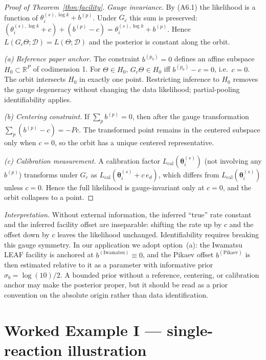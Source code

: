\documentclass[12pt]{article}
\theoremstyle{plain}
\theoremstyle{definition}
\theoremstyle{remark}
\newcommand{\R}{\mathbb{R}}
\begin{document}
\begin{proof}[Proof of Theorem~\ref{thm:facility}]
\emph{Gauge invariance.}  By (A6.1) the likelihood is a function of
$\theta_i^{(s),\log k}+b^{(p)}$.  Under $G_c$ this sum is preserved:
$(\theta_i^{(s),\log k}+c)+(b^{(p)}-c)=\theta_i^{(s),\log k}+b^{(p)}$.
Hence $L(G_c\Theta;\mathcal{D})=L(\Theta;\mathcal{D})$ and the
posterior is constant along the orbit.

\emph{(a) Reference paper anchor.}  The constraint $b^{(p_0)}=0$
defines an affine subspace $H_0\subset\R^P$ of codimension 1.  For
$\Theta\in H_0$, $G_c\Theta\in H_0$ iff $b^{(p_0)}-c=0$, i.e.\ $c=0$.
The orbit intersects $H_0$ in exactly one point.  Restricting
inference to $H_0$ removes the gauge degeneracy without changing the
data likelihood; partial-pooling identifiability
\citep[Ch.~6]{vdVaart1998} applies.

\emph{(b) Centering constraint.}  If $\sum_p b^{(p)}=0$, then after the
gauge transformation $\sum_p(b^{(p)}-c)=-Pc$.  The transformed point remains
in the centered subspace only when $c=0$, so the orbit has a unique centered
representative.

\emph{(c) Calibration measurement.}  A calibration factor
$L_{\mathrm{cal}}(\boldsymbol\theta_i^{(s)})$ (not involving any
$b^{(p)}$) transforms under $G_c$ as
$L_{\mathrm{cal}}(\boldsymbol\theta_i^{(s)}+c\,e_d)$, which differs
from $L_{\mathrm{cal}}(\boldsymbol\theta_i^{(s)})$ unless $c=0$.
Hence the full likelihood is gauge-invariant only at $c=0$, and the
orbit collapses to a point.
\end{proof}

\emph{Interpretation.}  Without external information, the inferred
``true'' rate constant and the inferred facility offset are
inseparable: shifting the rate up by $c$ and the offset down by $c$
leaves the likelihood unchanged.  Identifiability requires breaking
this gauge symmetry.  In our application we adopt option~(a): the
Iwamatsu LEAF facility is anchored at $b^{(\mathrm{Iwamatsu})}\equiv 0$,
and the Pikaev offset $b^{(\mathrm{Pikaev})}$ is then estimated
relative to it as a parameter with informative prior
$\sigma_b=\log(10)/2$.  A bounded prior without a reference, centering, or
calibration anchor may make the posterior proper, but it should be read as a
prior convention on the absolute origin rather than data identification.

\section{Worked Example I --- single-reaction illustration}\label{sec:worked1}
\end{document}
